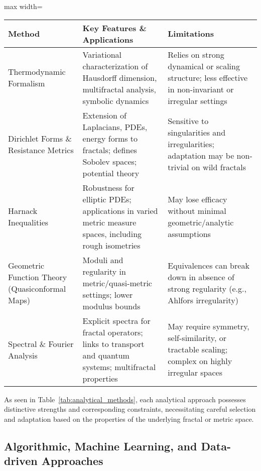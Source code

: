 \begin{table*}[htbp]
\centering
\caption{Comparative Overview of Analytical Techniques for Fractal and Metric Spaces}
\label{tab:analytical_methods}
\begin{adjustbox}{max width=\textwidth}
\begin{tabular}{lll}
\toprule
\textbf{Method} & \textbf{Key Features \& Applications} & \textbf{Limitations} \\
\midrule
Thermodynamic Formalism & Variational characterization of Hausdorff dimension, multifractal analysis, symbolic dynamics & Relies on strong dynamical or scaling structure; less effective in non-invariant or irregular settings \\
Dirichlet Forms \& Resistance Metrics & Extension of Laplacians, PDEs, energy forms to fractals; defines Sobolev spaces; potential theory & Sensitive to singularities and irregularities; adaptation may be non-trivial on wild fractals \\
Harnack Inequalities & Robustness for elliptic PDEs; applications in varied metric measure spaces, including rough isometries & May lose efficacy without minimal geometric/analytic assumptions \\
Geometric Function Theory (Quasiconformal Maps) & Moduli and regularity in metric/quasi-metric settings; lower modulus bounds & Equivalences can break down in absence of strong regularity (e.g., Ahlfors irregularity) \\
Spectral \& Fourier Analysis & Explicit spectra for fractal operators; links to transport and quantum systems; multifractal properties & May require symmetry, self-similarity, or tractable scaling; complex on highly irregular spaces \\
\bottomrule
\end{tabular}
\end{adjustbox}
\end{table*}

As seen in Table~\ref{tab:analytical_methods}, each analytical approach possesses distinctive strengths and corresponding constraints, necessitating careful selection and adaptation based on the properties of the underlying fractal or metric space.

\subsection{Algorithmic, Machine Learning, and Data-driven Approaches}

